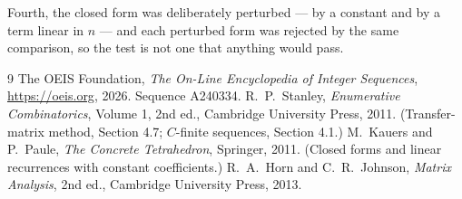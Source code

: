 \documentclass[11pt,a4paper]{article}
\theoremstyle{plain}
\theoremstyle{definition}
\begin{document}
Fourth, the closed form was deliberately perturbed --- by a constant and by a term linear in
$n$ --- and each perturbed form was rejected by the same comparison, so the test is not one
that anything would pass.

\begin{thebibliography}{9}
 The OEIS Foundation, \emph{The On-Line Encyclopedia of Integer
Sequences}, \url{https://oeis.org}, 2026. Sequence A240334.
 R.~P.~Stanley, \emph{Enumerative Combinatorics}, Volume 1, 2nd ed.,
Cambridge University Press, 2011. (Transfer-matrix method, Section 4.7; $C$-finite sequences,
Section 4.1.)
 M.~Kauers and P.~Paule, \emph{The Concrete Tetrahedron}, Springer, 2011.
(Closed forms and linear recurrences with constant coefficients.)
 R.~A.~Horn and C.~R.~Johnson, \emph{Matrix Analysis}, 2nd ed., Cambridge
University Press, 2013.
\end{thebibliography}
\end{document}
